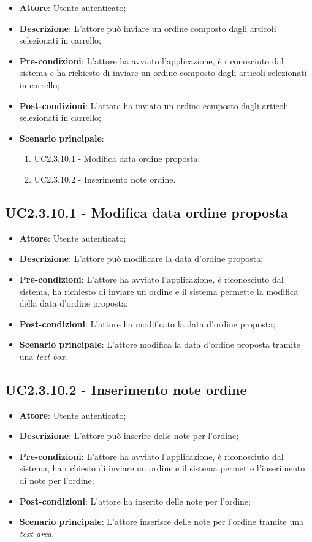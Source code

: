 \begin{itemize}
	\item \textbf{Attore}: Utente autenticato;
	\item \textbf{Descrizione}: L'attore può inviare un ordine composto dagli articoli selezionati in carrello;
	\item \textbf{Pre-condizioni}: L'attore ha avviato l'applicazione, è riconosciuto dal sistema e ha richiesto di inviare un ordine composto dagli articoli selezionati in carrello;
	\item \textbf{Post-condizioni}: L'attore ha inviato un ordine composto dagli articoli selezionati in carrello;
	\item \textbf{Scenario principale}:
		\begin{enumerate}
			\item UC2.3.10.1 - Modifica data ordine proposta;
			\item UC2.3.10.2 - Inserimento note ordine.
		\end{enumerate}
\end{itemize}

\subsection{UC2.3.10.1 - Modifica data ordine proposta}

\begin{itemize}
	\item \textbf{Attore}: Utente autenticato;
	\item \textbf{Descrizione}: L'attore può modificare la data d'ordine proposta;
	\item \textbf{Pre-condizioni}: L'attore ha avviato l'applicazione, è riconosciuto dal sistema, ha richiesto di inviare un ordine e il sistema permette la modifica della data d'ordine proposta;
	\item \textbf{Post-condizioni}: L'attore ha modificato la data d'ordine proposta;
	\item \textbf{Scenario principale}: L'attore modifica la data d'ordine proposta tramite una \textit{text box}.
\end{itemize}

\subsection{UC2.3.10.2 - Inserimento note ordine}

\begin{itemize}
	\item \textbf{Attore}: Utente autenticato;
	\item \textbf{Descrizione}: L'attore può inserire delle note per l'ordine;
	\item \textbf{Pre-condizioni}: L'attore ha avviato l'applicazione, è riconosciuto dal sistema, ha richiesto di inviare un ordine e il sistema permette l'inserimento di note per l'ordine;
	\item \textbf{Post-condizioni}: L'attore ha inserito delle note per l'ordine;
	\item \textbf{Scenario principale}: L'attore inserisce delle note per l'ordine tramite una \textit{text area}.
\end{itemize}

